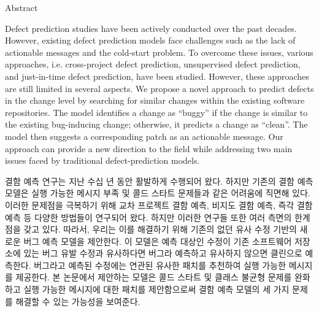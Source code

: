 
\newcommand{\abstractEN}[1]{\normalsize #1 \par}
\newcommand{\abstractKR}[1]{\normalsize #1 \par}

\fontsize{14}{18} \selectfont Abstract \par
{}

\bigskip
\abstractEN{
    Defect prediction studies have been actively conducted over the past decades.
    However, existing defect prediction models face challenges such as the lack of actionable messages and the cold-start problem.
    To overcome these issues, various approaches, i.e. cross-project defect prediction, unsupervised defect prediction, and just-in-time defect prediction, have been studied.
    However, these approaches are still limited in several aspects.
    We propose a novel approach to predict defects in the change level by searching for similar changes within the existing software repositories.
    The model identifies a change as ``buggy'' if the change is similar to the existing bug-inducing change; otherwise, it predicts a change as ``clean''.
    The model then suggests a corresponding patch as an actionable message.
    Our approach can provide a new direction to the field while addressing two main issues faced by traditional defect-prediction models.
}
\bigskip
\bigskip
\abstractKR{
    결함 예측 연구는 지난 수십 년 동안 활발하게 수행되어 왔다.
    하지만 기존의 결함 예측 모델은 실행 가능한 메시지 부족 및 콜드 스타트 문제들과 같은 어려움에 직면해 있다.
    이러한 문제점을 극복하기 위해 교차 프로젝트 결함 예측, 비지도 결함 예측, 즉각 결함 예측 등 다양한 방법들이 연구되어 왔다.
    하지만 이러한 연구들 또한 여러 측면의 한계점을 갖고 있다.
    따라서, 우리는 이를 해결하기 위해 기존의 없던 유사 수정 기반의 새로운 버그 예측 모델을 제안한다.
    이 모델은 예측 대상인 수정이 기존 소프트웨어 저장소에 있는 버그 유발 수정과 유사하다면 버그라 예측하고 유사하지 않으면 클린으로 예측한다.
    버그라고 예측된 수정에는 연관된 유사한 패치를 추천하여 실행 가능한 메시지를 제공한다.
    본 논문에서 제안하는 모델은 콜드 스타트 및 클래스 불균형 문제를 완화하고 실행 가능한 메시지에 대한 패치를 제안함으로써 결함 예측 모델의 세 가지 문제를 해결할 수 있는 가능성을 보여준다.
}

\clearpage
